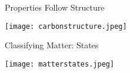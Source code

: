 \documentclass[notes=only]{beamer}
\begin{document}
%

\begin{frame}{Properties Follow Structure}
	\begin{center}
		\texttt{[image: carbonstructure.jpeg]}
	\end{center}
\end{frame}

\begin{frame}{Classifying Matter: States}

	\begin{center}
		\texttt{[image: matterstates.jpeg]}
	\end{center}
\end{frame}
\end{document}
